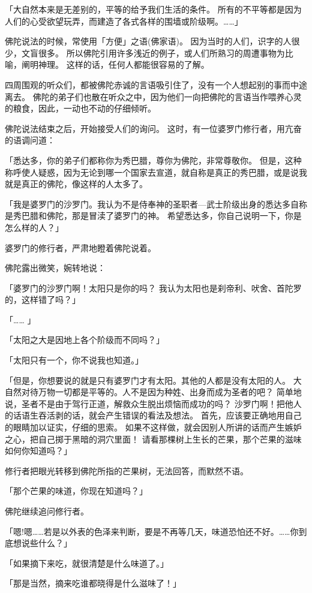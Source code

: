 \documentclass[twoside,openany]{book}
\begin{document}
「大自然本来是无差别的，平等的给予我们生活的条件。
所有的不平等都是因为人们的心受欲望玩弄，而建造了各式各样的围墙或阶级啊。……」		

佛陀说法的时候，常使用「方便」之语(佛家语)。
因为当时的人们，识字的人很少，文盲很多。
所以佛陀引用许多浅近的例子，或人们所熟习的周遭事物为比喻，阐明神理。
这样的话，任何人都能很容易的了解。

四周围观的听众们，都被佛陀赤诚的言语吸引住了，没有一个人想起别的事而中途离去。
佛陀的弟子们也散在听众之中，因为他们一向把佛陀的言语当作喂养心灵的粮食，因此，一动也不动的仔细倾听。

佛陀说法结束之后，开始接受人们的询问。
这时，有一位婆罗门修行者，用亢奋的语调问道：

「悉达多，你的弟子们都称你为秀巴腊，尊你为佛陀，非常尊敬你。
但是，这种称呼使人疑惑，因为无论到哪一个国家去宣道，就自称是真正的秀巴腊，或是说我就是真正的佛陀，像这样的人太多了。

「我是婆罗门的沙罗门。我认为不是侍奉神的圣职者---武士阶级出身的悉达多自称是秀巴腊和佛陀，那是冒渎了婆罗门的神。
希望悉达多，你自己说明一下，你是怎么样的人？」

婆罗门的修行者，严肃地瞪着佛陀说着。

佛陀露出微笑，婉转地说：

「婆罗门的沙罗门啊！太阳只是你的吗？
我认为太阳也是刹帝利、吠舍、首陀罗的，这样错了吗？」

「……	」

「太阳之大是因地上各个阶级而不同吗？」

「太阳只有一个，你不说我也知道。」

「但是，你想要说的就是只有婆罗门才有太阳。其他的人都是没有太阳的人。
大自然对待万物一切都是平等的。人不是因为种姓、出身而成为圣者的吧？
简单地说，圣者不是由于驾行正道，解救众生脱出烦恼而成功的吗？
沙罗门啊！把他人的话语生吞活剥的话，就会产生错误的看法及想法。
首先，应该要正确地用自己的眼睛加以证实，仔细的思索。
如果不这样做，就会因别人所讲的话而产生嫉妒之心，把自己掷于黑暗的洞穴里面！
请看那棵树上生长的芒果，那个芒果的滋味如何你知道吗？」

修行者把眼光转移到佛陀所指的芒果树，无法回答，而默然不语。

「那个芒果的味道，你现在知道吗？」

佛陀继续追问修行者。

「嗯!嗯……若是以外表的色泽来判断，要是不再等几天，味道恐怕还不好。……你到底想说些什么？」

「如果摘下来吃，就很清楚是什么味道了。」

「那是当然，摘来吃谁都晓得是什么滋味了！」
\end{document}
